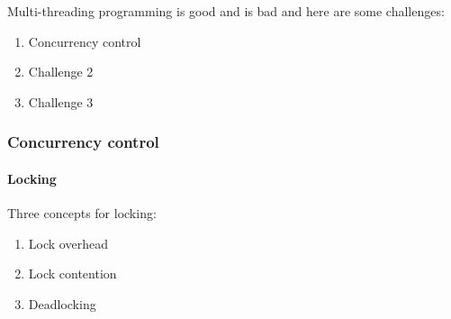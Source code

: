 Multi-threading programming is good and is bad and here are some challenges:

\begin{enumerate}
	\item Concurrency control
	\item Challenge 2
	\item Challenge 3
\end{enumerate}

\subsubsection{Concurrency control}

\paragraph{Locking}


Three concepts for locking:

\begin{enumerate}
	\item Lock overhead
	\item Lock contention
	\item Deadlocking
\end{enumerate}
